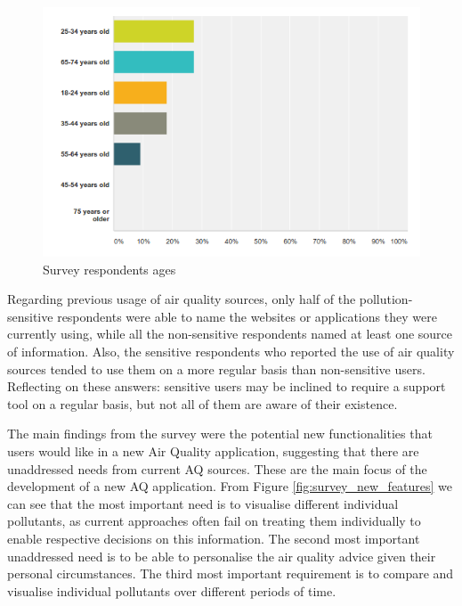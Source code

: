 \begin{figure}[H]
\begin{adjustbox}{width=1\textwidth,center=\textwidth}
  \centering
  \includegraphics[scale=1]{images/ages_survey.png}
\end{adjustbox}
  \caption[Survey respondents ages ]{Survey respondents ages}
  \label{fig:survey_ages}
\end{figure}

Regarding previous usage of air quality sources, only half of the pollution-sensitive respondents were able to name the websites or applications they were currently using, while all the non-sensitive respondents named at least one source of information. Also, the sensitive respondents who reported the use of air quality sources tended to use them on a more regular basis than non-sensitive users. Reflecting on these answers: sensitive users may be inclined to require a support tool on a regular basis, but not all of them are aware of their existence.

The main findings from the survey were the potential new functionalities that users would like in a new Air Quality application, suggesting that there are unaddressed needs from current AQ sources. These are the main focus of the development of a new AQ application. From Figure \ref{fig:survey_new_features} we can see that the most important need is to visualise different individual pollutants, as current approaches often fail on treating them individually to enable respective decisions on this information. The second most important unaddressed need is to be able to personalise the air quality advice given their personal circumstances. The third most important requirement is to compare and visualise individual pollutants over different periods of time. 

